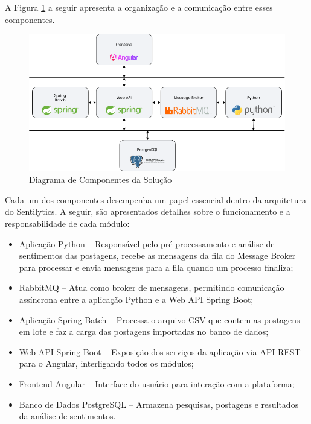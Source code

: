 \documentclass[
	12pt,				%
	oneside,			%
	a4paper,			%
	english,			%
	french,				%
	spanish,			%
	brazil				%
	]{abntex2}
\begin{document}
A Figura \ref{diagrama_componentes} a seguir apresenta a organização e a
comunicação entre esses componentes.

\begin{figure}[htbp]
\hypertarget{diagrama_componentes}{%
\caption{Diagrama de Componentes da Solução}\label{diagrama_componentes}
\begin{center}
\includegraphics[scale=0.4]{imagens/sentilytics/diagramas/diagrama_componentes.png}
\end{center}
}
\end{figure}

Cada um dos componentes desempenha um papel essencial dentro da
arquitetura do Sentilytics. A seguir, são apresentados detalhes sobre o
funcionamento e a responsabilidade de cada módulo:

\begin{itemize}
\tightlist
\item
  Aplicação Python -- Responsável pelo pré-processamento e análise de
  sentimentos das postagens, recebe as mensagens da fila do Message
  Broker para processar e envia mensagens para a fila quando um processo
  finaliza;
\item
  RabbitMQ -- Atua como broker de mensagens, permitindo comunicação
  assíncrona entre a aplicação Python e a Web API Spring Boot;
\item
  Aplicação Spring Batch -- Processa o arquivo CSV que contem as
  postagens em lote e faz a carga das postagens importadas no banco de
  dados;
\item
  Web API Spring Boot -- Exposição dos serviços da aplicação via API
  REST para o Angular, interligando todos os módulos;
\item
  Frontend Angular -- Interface do usuário para interação com a
  plataforma;
\item
  Banco de Dados PostgreSQL -- Armazena pesquisas, postagens e
  resultados da análise de sentimentos.
\end{itemize}
\end{document}
